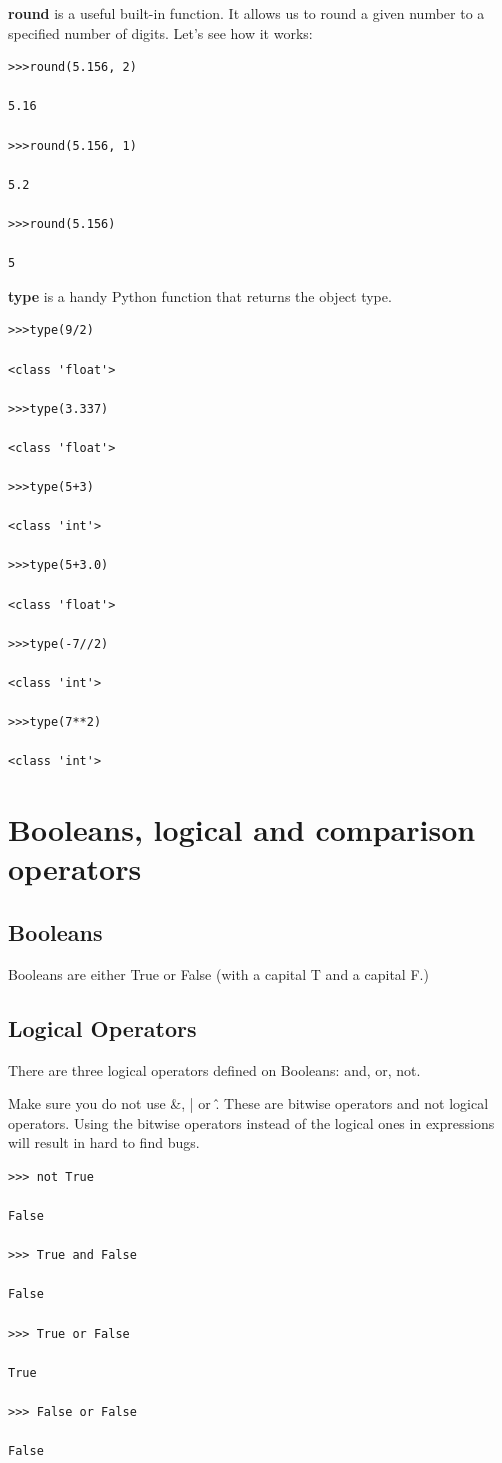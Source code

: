\documentclass{article}
\begin{document}
\textbf{round} is a useful built-in function.  It allows us to round a given number to a specified number of digits.  Let's see how it works:
\begin{lstlisting}
>>>round(5.156, 2)

5.16

>>>round(5.156, 1)

5.2

>>>round(5.156)

5
\end{lstlisting}
\textbf{type} is a handy Python function that returns the object type.

\begin{lstlisting}
>>>type(9/2)

<class 'float'>

>>>type(3.337)

<class 'float'>

>>>type(5+3)

<class 'int'>

>>>type(5+3.0)

<class 'float'>

>>>type(-7//2)

<class 'int'>

>>>type(7**2)

<class 'int'>
\end{lstlisting}

\section{Booleans, logical and comparison operators }

\subsection{Booleans}
Booleans are either True or False (with a capital T and a capital F.)

\subsection{Logical Operators}
There are  three logical operators defined on  Booleans: and, or,  not.

Make sure you do not use \&, | or \^.  These are bitwise operators and not logical operators. Using the bitwise operators instead of the logical ones in expressions will result in hard to find bugs.  

\begin{lstlisting}
>>> not True

False

>>> True and False

False

>>> True or False

True

>>> False or False

False
\end{lstlisting}
\end{document}
